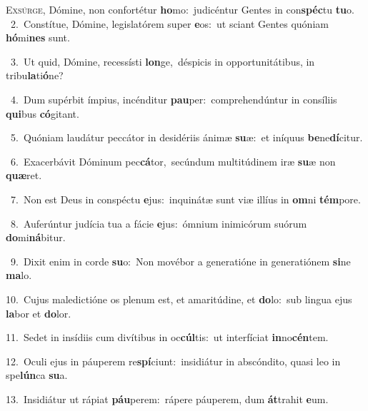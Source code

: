 \lettrine{\initial\textcolor{\initialcolor}{E}}{xsúrge,} Dómine, non confortétur \textbf{ho}\-mo:~\star judicéntur Gentes in con\-\textbf{spéc}\-tu \textbf{tu}\-o.\\
{\numbfont\textcolor{\numbcolor}{~2.}}~Constítue, Dómine, legislatórem super \textbf{e}\-os:~\star ut sciant Gentes quóniam \textbf{hó}\-mi\textbf{nes} sunt.\par
{\numbfont\textcolor{\numbcolor}{~3.}}~Ut quid, Dómine, recessísti \textbf{lon}\-ge,~\star déspicis in opportunitátibus, in tribu\-\textbf{la}\-ti\-\textbf{ó}\-ne?\par
{\numbfont\textcolor{\numbcolor}{~4.}}~Dum supérbit ímpius, incénditur \textbf{pau}\-per:~\star comprehendúntur in consíliis \textbf{qui}\-bus \textbf{có}\-gitant.\par
{\numbfont\textcolor{\numbcolor}{~5.}}~Quóniam laudátur peccátor in desidériis ánimæ \textbf{su}\-æ:~\star et iníquus \textbf{be}\-ne\-\textbf{dí}\-citur.\par
{\numbfont\textcolor{\numbcolor}{~6.}}~Exacerbávit Dóminum pec\-\textbf{cá}\-tor,~\star secúndum multitúdinem iræ \textbf{su}\-æ non \textbf{quæ}\-ret.\par
{\numbfont\textcolor{\numbcolor}{~7.}}~Non est Deus in conspéctu \textbf{e}\-jus:~\star inquinátæ sunt viæ illíus in \textbf{om}\-ni \textbf{tém}\-pore.\par
{\numbfont\textcolor{\numbcolor}{~8.}}~Auferúntur judícia tua a fácie \textbf{e}\-jus:~\star ómnium inimicórum suórum \textbf{do}\-mi\-\textbf{ná}\-bitur.\par
{\numbfont\textcolor{\numbcolor}{~9.}}~Dixit enim in corde \textbf{su}\-o:~\star Non movébor a generatióne in generatiónem \textbf{si}\-ne \textbf{ma}\-lo.\par
{\numbfont\textcolor{\numbcolor}{10.}}~Cujus maledictióne os plenum est, et amaritúdine, et \textbf{do}\-lo:~\star sub lingua ejus \textbf{la}\-bor et \textbf{do}\-lor.\par
{\numbfont\textcolor{\numbcolor}{11.}}~Sedet in insídiis cum divítibus in oc\-\textbf{cúl}\-tis:~\star ut interfíciat \textbf{in}\-no\-\textbf{cén}\-tem.\par
{\numbfont\textcolor{\numbcolor}{12.}}~Oculi ejus in páuperem re\-\textbf{spí}\-ciunt:~\star insidiátur in abscóndito, quasi leo in spe\-\textbf{lún}\-ca \textbf{su}\-a.\par
{\numbfont\textcolor{\numbcolor}{13.}}~Insidiátur ut rápiat \textbf{páu}\-perem:~\star rápere páuperem, dum \textbf{át}\-trahit \textbf{e}\-um.\par
